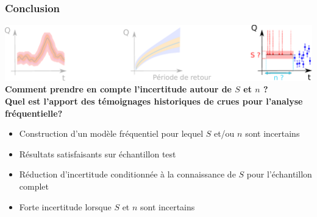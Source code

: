\documentclass[compress,9pt]{beamer}
\begin{document}
		
		\begin{frame}[t]
		\frametitle{Conclusion}
		\centering
		\includegraphics[width = .95\textwidth]{./Figures/SchemaConclu3.pdf} 
		\vfill
		\textbf{Comment prendre en compte l'incertitude autour de $S$ et $n$ ?}\\
		\vspace{5pt}
		\textbf{Quel est l'apport des témoignages historiques de crues pour l'analyse fréquentielle?}\\
		\vfill
		\begin{itemize}
			\item<1->[$\vartriangleright$] Construction d'un modèle fréquentiel pour lequel $S$ et/ou $n$ sont incertains
			\item<2->[$\vartriangleright$] Résultats satisfaisants sur échantillon test
			\item<3->[$\vartriangleright$] Réduction d'incertitude conditionnée à la connaissance de $S$ pour l'échantillon complet
			\item<4->[$\vartriangleright$] Forte incertitude lorsque $S$ et $n$ sont incertains
		\end{itemize}
	\end{frame}
\end{document}
